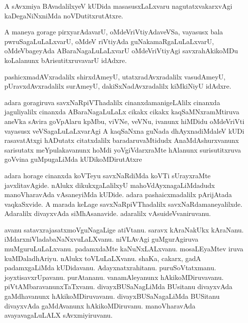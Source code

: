 \documentclass{article}
\begin{document}
\begin{mn}%
A sAvxmiya BAvadalilxyeV kUDida masasusxLaLxvaru nagutatxvakarxvAgi kaDegaNiNxniMda 
noVDutitxrutAtxre.
\end{mn}

\begin{mn}%
A maneya gorage pirxyarAdavarU, oMdeVriVtiyAdaveVSa, vayasusx bala pwruSagaLuLaLxvarU, 
oMdeV riVtiyAda guNakamaRgaLuLaLxvarU, oMdeVbageyAda ABaraNagaLuLaLxvarU oMdeVriVtiyAgi 
savxrahAkikoMDu koLalanunx bArisutitxruvavarU idAdxre.
\end{mn}

\begin{mn}%
pashicxmadAVxradalilx shirxdAmeyU, utatxradAvxradalilx vasudAmeyU, pUravxdAvxradalilx
surAmeyU, dakiSxNadAvxradalilx kiMkiNiyU idAdxre.
\end{mn}

\begin{mn}%
adara goragiruva savxNaRpiVThadalilx cinanxdamanigeLAlilx cinanxda jaguliyalilx cinanxda 
ABaraNagaLuLaLx cikakx cikakx kaqSaMNxramMtiruva aneVka sAvira goVpAlaru kpMbu, viVNe, veVNu,
ivanunx hiMDidu  oMdeVriVti vayasusx veVSagaLuLaLxvarAgi A kaqSaNxna guNada 
dhAyxnadiMdaleV kUDi rasavatAtxgi hADutatx citatxdalilx baradaruvaMtidudx 
AnaMdAshurxvanunx sarisutatx meYpulakavanunx hoMdi yoVgiVdarxraMte hAlanunx surisutitxruva 
goVvina guMpugaLiMda kUDikoMDirutAtxre
\end{mn}

\begin{mn}%
adara horage cinanxda koVTeyu savxNaRdiMda koVTi sUrayxraMte javxlitavAgide. nAlukx  
dikukxgaLalilxyU mahoVdAyxnagaLiMdadudx manoVharavAda vAsaneyiMda kUDide. adara 
pashaicxmadalilx pArijAtada vaqkaSxvide. A marada keLage savxNaRpiVThadalilx 
savxNaRdamaneyalilxde. Adaralilx divayxvAda siMhAsanavide. adaralilx vAsuideVvaniruvanu.
\end{mn}

\begin{mn}%
avanu satavxrajasatxmoVguNagaLige atiVtanu. saravx kAraNakUkx kAraNanu. 
iMdarxniVladabaNaNxvuLaLXvanu. niVLAvAgi guMgurAgiruva muMguruLuLaLxvanu. padamxdaMte
kaNuNxLALxvanu. mosaLEyaMtev iruva kuMDaladhAriyu. nAlukx toVLuLaLXvanu. shaKa, cakarx, gadA 
padamxgaLiMda kUDidavanu. Adayxnatxrahitanu. puruSoVtatxmanu. joyxtisavxrUpavanu. purAtananu.
vanamAleyanunx hAkikoMDiruvavanu. piVtAMbaravanunxTaTxvanu. divayxBUSaNagLiMda BUsitanu 
divayxvAda gaMdhavanunx hAkikoMDiruvavanu. divayxBUSaNagaLiMda BUSitanu divayxvAda 
gaMdAvanunx hAkikoMDiruvanu. manoVharavAda avayavagaLuLALX sAvxmiyiruvanu.
\end{mn}
\end{document}
